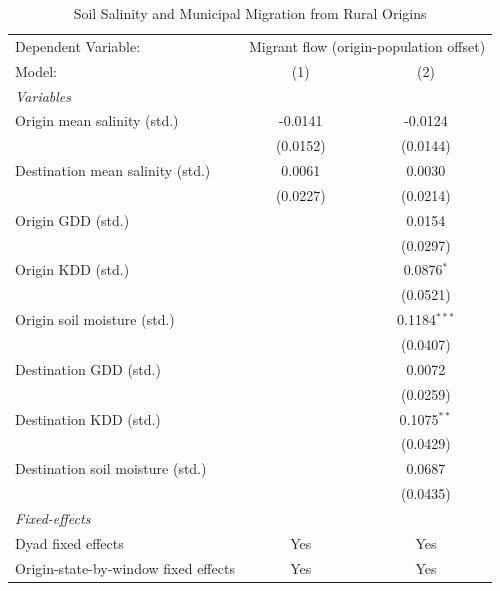 
\begin{table}[htbp]
\color{red}
   \caption{\label{tab:full_revision_rural_migration_ppml} Soil Salinity and Municipal Migration from Rural Origins}
   \centering
\footnotesize
\setlength{\tabcolsep}{4pt}
\renewcommand{\arraystretch}{0.86}
   \begin{tabular}{lcc}
      \tabularnewline \midrule \midrule
      Dependent Variable: & \multicolumn{2}{c}{Migrant flow (origin-population offset)}\\
      Model:                           & (1)      & (2)\\  
      \midrule
      \emph{Variables}\\
      Origin mean salinity (std.)      & -0.0141  & -0.0124\\   
                                       & (0.0152) & (0.0144)\\   
      Destination mean salinity (std.) & 0.0061   & 0.0030\\   
                                       & (0.0227) & (0.0214)\\   
      Origin GDD (std.)                &          & 0.0154\\   
                                       &          & (0.0297)\\   
      Origin KDD (std.)                &          & 0.0876$^{*}$\\   
                                       &          & (0.0521)\\   
      Origin soil moisture (std.)      &          & 0.1184$^{***}$\\   
                                       &          & (0.0407)\\   
      Destination GDD (std.)           &          & 0.0072\\   
                                       &          & (0.0259)\\   
      Destination KDD (std.)           &          & 0.1075$^{**}$\\   
                                       &          & (0.0429)\\   
      Destination soil moisture (std.) &          & 0.0687\\   
                                       &          & (0.0435)\\   
      \midrule
      \emph{Fixed-effects}\\
      Dyad fixed effects                             & Yes      & Yes\\  
      Origin-state-by-window fixed effects                 & Yes      & Yes\\  

\end{tabular}
\end{table}

